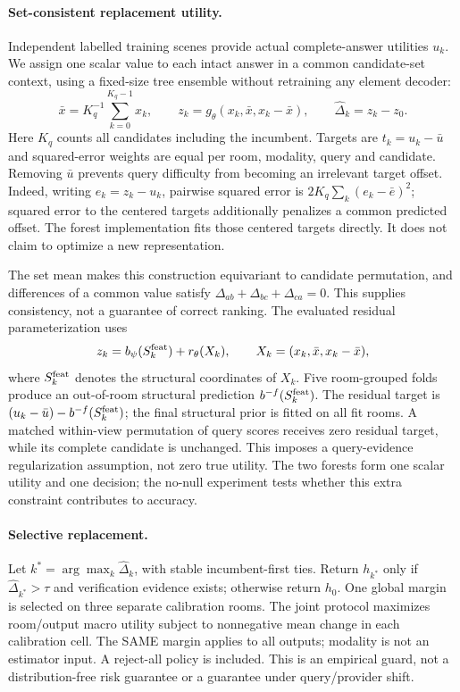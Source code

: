 \paragraph{Set-consistent replacement utility.}
Independent labelled training scenes provide actual complete-answer utilities
$u_k$. We assign one scalar value to each intact answer in a common candidate-set
context, using a fixed-size tree ensemble without retraining any element decoder:
\[
 \bar x=K_q^{-1}\sum_{k=0}^{K_q-1}x_k,\qquad
 z_k=g_\theta(x_k,\bar x,x_k-\bar x),\qquad
 \widehat\Delta_k=z_k-z_0.
\]
Here $K_q$ counts all candidates including the incumbent. Targets are
$t_k=u_k-\bar u$ and squared-error weights are equal per room, modality, query
and candidate. Removing $\bar u$ prevents query difficulty from becoming an
irrelevant target offset. Indeed, writing $e_k=z_k-u_k$, pairwise squared error
is $2K_q\sum_k(e_k-\bar e)^2$; squared error to the centered targets additionally
penalizes a common predicted offset. The forest implementation fits those
centered targets directly. It does not claim to optimize a new representation.

The set mean makes this construction equivariant to candidate permutation, and
differences of a common value satisfy
$\Delta_{ab}+\Delta_{bc}+\Delta_{ca}=0$. This supplies consistency, not a
guarantee of correct ranking. The evaluated residual parameterization uses
\[
 z_k=b_\psi(S_k^{\rm feat})+r_\theta(X_k),\qquad
 X_k=(x_k,\bar x,x_k-\bar x),
\]
where $S_k^{\rm feat}$ denotes the structural coordinates of $X_k$.
Five room-grouped folds produce an out-of-room structural prediction
$b^{-f}(S_k^{\rm feat})$. The residual target is
$(u_k-\bar u)-b^{-f}(S_k^{\rm feat})$; the final structural prior is fitted
on all fit rooms. A matched within-view permutation of query scores receives
zero residual target, while its complete candidate is unchanged. This imposes
a query-evidence regularization assumption, not zero true utility. The two
forests form one scalar utility and one decision; the no-null experiment tests
whether this extra constraint contributes to accuracy.

\paragraph{Selective replacement.}
Let $k^*=\arg\max_k\widehat\Delta_k$, with stable incumbent-first ties. Return
$h_{k^*}$ only if $\widehat\Delta_{k^*}>\tau$ and verification evidence exists;
otherwise return $h_0$. One global margin is selected on three separate
calibration rooms. The joint protocol maximizes room/output macro utility
subject to nonnegative mean change in each calibration cell.
The SAME margin applies to all outputs; modality is not an estimator input.
A reject-all policy is included. This is an
empirical guard, not a distribution-free risk guarantee or a guarantee under
query/provider shift.

